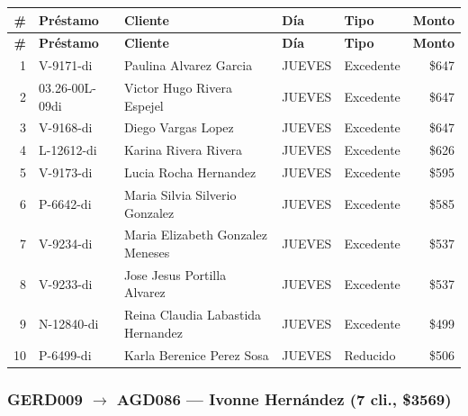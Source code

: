 \documentclass[11pt,a4paper]{article}
\newcommand{\money}[1]{\$\num{#1}}
\begin{document}
\begin{center}
\renewcommand{\arraystretch}{1.1}
\footnotesize
\begin{longtable}{rlp{5.5cm}llr}
\toprule
\textbf{\#} & \textbf{Pr\'estamo} & \textbf{Cliente} & \textbf{D\'ia} & \textbf{Tipo} & \textbf{Monto} \\
\midrule
\endfirsthead
\toprule
\textbf{\#} & \textbf{Pr\'estamo} & \textbf{Cliente} & \textbf{D\'ia} & \textbf{Tipo} & \textbf{Monto} \\
\midrule
\endhead
1 & V-9171-di & Paulina Alvarez Garcia & JUEVES & Excedente & \money{647} \\
2 & 03.26-00L-09di & Victor Hugo Rivera Espejel & JUEVES & Excedente & \money{647} \\
3 & V-9168-di & Diego Vargas Lopez & JUEVES & Excedente & \money{647} \\
4 & L-12612-di & Karina Rivera Rivera & JUEVES & Excedente & \money{626} \\
5 & V-9173-di & Lucia Rocha Hernandez & JUEVES & Excedente & \money{595} \\
6 & P-6642-di & Maria Silvia Silverio Gonzalez & JUEVES & Excedente & \money{585} \\
7 & V-9234-di & Maria Elizabeth Gonzalez Meneses & JUEVES & Excedente & \money{537} \\
8 & V-9233-di & Jose Jesus Portilla Alvarez & JUEVES & Excedente & \money{537} \\
9 & N-12840-di & Reina Claudia Labastida Hernandez & JUEVES & Excedente & \money{499} \\
10 & P-6499-di & Karla Berenice Perez Sosa & JUEVES & Reducido & \money{506} \\

\bottomrule
\end{longtable}
\end{center}
\subsubsection{GERD009 $\rightarrow$ AGD086 --- Ivonne Hernández (7 cli., \money{3569})}
\end{document}
